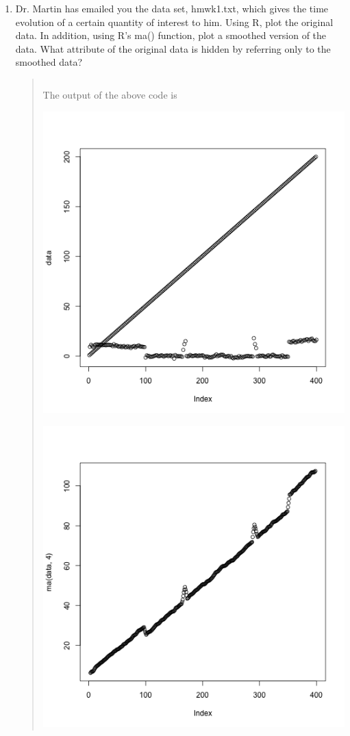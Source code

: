 \documentclass{hw}
\begin{document}

\begin{enumerate}
\item Dr. Martin has emailed you the data set, hmwk1.txt, which gives the time evolution of a
certain quantity of interest to him. Using R, plot the original data. In addition, using R’s ma()
function, plot a smoothed version of the data. What attribute of the original data is hidden by
referring only to the smoothed data?
\begin{quote}
\inputminted{r}{num_one.R}
The output of the above code is\\
\begin{minipage}{0.5\textwidth}
\includegraphics[scale=0.4]{01data_plot}
\end{minipage}
\begin{minipage}{0.5\textwidth}
\includegraphics[scale=0.4]{01data_smoothed}

\end{minipage}
\end{quote}
\end{enumerate}
\end{document}
